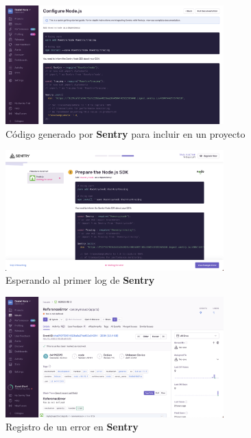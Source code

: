 \begin{figure}[h]
\centering
\includegraphics[width=0.75\textwidth]{imagenes/implementacion/sentry_codigo_generado.png}
\caption{Código generado por \textbf{Sentry} para incluir en un proyecto}
\label{fig:sentryCodigoGenerado}
\end{figure}

\begin{figure}[h]
\centering
\includegraphics[width=0.75\textwidth]{imagenes/implementacion/sentry_esperando_log.png}
\caption{Esperando al primer log de \textbf{Sentry}}
\label{fig:sentryEsperandoLog}
\end{figure}

\begin{figure}[h]
\centering
\includegraphics[width=0.75\textwidth]{imagenes/implementacion/sentry_log.png}
\caption{Registro de un error en \textbf{Sentry}}
\label{fig:sentryLog}
\end{figure}

